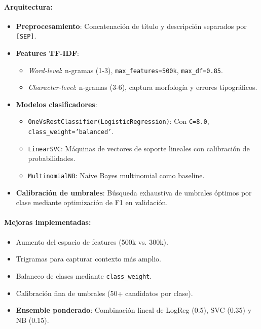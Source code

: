 \paragraph{Arquitectura:}
\begin{itemize}
    \item \textbf{Preprocesamiento}: Concatenación de título y descripción separados por \texttt{[SEP]}.
    \item \textbf{Features TF-IDF}:
    \begin{itemize}
        \item \textit{Word-level}: n-gramas (1-3), \texttt{max\_features=500k}, \texttt{max\_df=0.85}.
        \item \textit{Character-level}: n-gramas (3-6), captura morfología y errores tipográficos.
    \end{itemize}
    \item \textbf{Modelos clasificadores}:
    \begin{itemize}
        \item \texttt{OneVsRestClassifier(LogisticRegression)}: Con \texttt{C=8.0}, \texttt{class\_weight='balanced'}.
        \item \texttt{LinearSVC}: Máquinas de vectores de soporte lineales con calibración de probabilidades.
        \item \texttt{MultinomialNB}: Naive Bayes multinomial como baseline.
    \end{itemize}
    \item \textbf{Calibración de umbrales}: Búsqueda exhaustiva de umbrales óptimos por clase mediante optimización de F1 en validación.
\end{itemize}

\paragraph{Mejoras implementadas:}
\begin{itemize}
    \item Aumento del espacio de features (500k vs. 300k).
    \item Trigramas para capturar contexto más amplio.
    \item Balanceo de clases mediante \texttt{class\_weight}.
    \item Calibración fina de umbrales (50+ candidatos por clase).
    \item \textbf{Ensemble ponderado}: Combinación lineal de LogReg (0.5), SVC (0.35) y NB (0.15).
\end{itemize}

